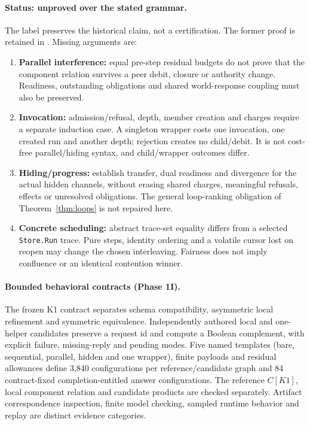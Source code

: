 \documentclass[11pt,a4paper]{article}
\theoremstyle{definition}
\theoremstyle{remark}
\begin{document}
\paragraph{Status: unproved over the stated grammar.} The label preserves the historical claim, not a certification. The former proof is retained in . Missing arguments are:
\begin{enumerate}
\item \textbf{Parallel interference:} equal pre-step residual budgets do not prove that the component relation survives a peer debit, closure or authority change. Readiness, outstanding obligations and shared world-response coupling must also be preserved.
\item \textbf{Invocation:} admission/refusal, depth, member creation and charges require a separate induction case. A singleton wrapper costs one invocation, one created run and another depth; rejection creates no child/debit. It is not cost-free parallel/hiding syntax, and child/wrapper outcomes differ.
\item \textbf{Hiding/progress:} establish transfer, dual readiness and divergence for the actual hidden channels, without erasing shared charges, meaningful refusals, effects or unresolved obligations. The general loop-ranking obligation of Theorem~\ref{thm:loops} is not repaired here.
\item \textbf{Concrete scheduling:} abstract trace-set equality differs from a selected \texttt{Store.Run} trace. Pure steps, identity ordering and a volatile cursor lost on reopen may change the chosen interleaving. Fairness does not imply confluence or an identical contention winner.
\end{enumerate}

\paragraph{Bounded behavioral contracts (Phase 1I).} The frozen K1 contract separates schema compatibility, asymmetric local refinement and symmetric equivalence. Independently authored local and one-helper candidates preserve a request id and compute a Boolean complement, with explicit failure, missing-reply and pending modes. Five named templates (bare, sequential, parallel, hidden and one wrapper), finite payloads and residual allowances define 3,840 configurations per reference/candidate graph and 84 contract-fixed completion-entitled answer configurations. The reference $C[K1]$, local component relation and candidate products are checked separately. Artifact correspondence inspection, finite model checking, sampled runtime behavior and replay are distinct evidence categories.
\end{document}
